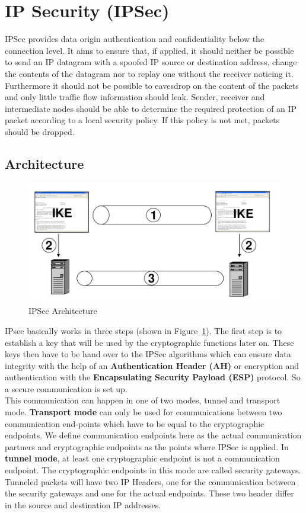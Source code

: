 
\section{IP Security (IPSec)}
IPSec provides data origin authentication and confidentiality below the connection level.
It aims to ensure that, if applied, it should neither be possible to send an IP datagram with a spoofed IP source or destination address, change the contents of the datagram nor to replay one without the receiver noticing it.
Furthermore it should not be possible to eavesdrop on the content of the packets and only little traffic flow information should leak.
Sender, receiver and intermediate nodes should be able to determine the required protection of an IP packet according to a local security policy.
If this policy is not met, packets should be dropped.

\subsection{Architecture}
\begin{figure}[h]
  \centering
  \includegraphics[width=.8\textwidth]{figures/ipsec_arch.png}
  \caption{IPSec Architecture}\label{fig:ipsec_arch}
\end{figure}
IPsec basically works in three steps (shown in Figure~\ref{fig:ipsec_arch}).
The first step is to establish a key that will be used by the cryptographic functions later on.
These keys then have to be hand over to the IPSec algorithms which can ensure data integrity with the help of an \textbf{Authentication Header (AH)} or encryption and authentication with the \textbf{Encapsulating Security Payload (ESP)} protocol.
So a secure communication is set up.\\

This communication can happen in one of two modes, tunnel and transport mode.
\textbf{Transport mode} can only be used for communications between two communication end-points which have to be equal to the cryptographic endpoints.
We define communication endpoints here as the actual communication partners and cryptographic endpoints as the points where IPSec is applied.
In \textbf{tunnel mode}, at least one cryptographic endpoint is not a communication endpoint.
The cryptographic endpoints in this mode are called security gateways.
Tunneled packets will have two IP Headers, one for the communication between the security gateways and one for the actual endpoints.
These two header differ in the source and destination IP addresses.\\

